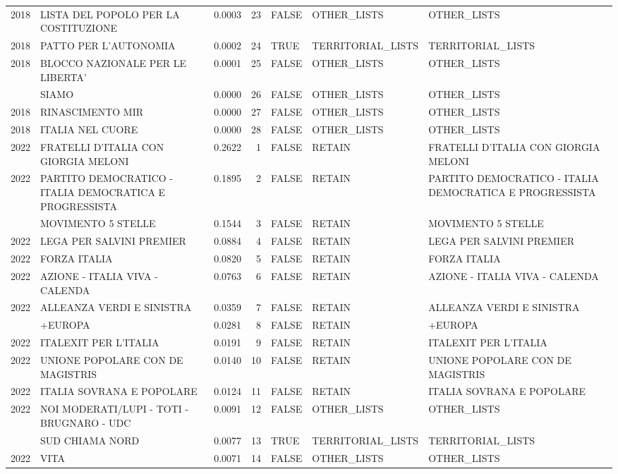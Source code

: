 \begin{longtable}[t]{rlrrlll}
2018 & LISTA DEL POPOLO PER LA COSTITUZIONE & 0.0003 & 23 & FALSE & OTHER\_LISTS & OTHER\_LISTS\\
2018 & PATTO PER L'AUTONOMIA & 0.0002 & 24 & TRUE & TERRITORIAL\_LISTS & TERRITORIAL\_LISTS\\
2018 & BLOCCO NAZIONALE PER LE LIBERTA' & 0.0001 & 25 & FALSE & OTHER\_LISTS & OTHER\_LISTS\\
\addlinespace
2018 & SIAMO & 0.0000 & 26 & FALSE & OTHER\_LISTS & OTHER\_LISTS\\
2018 & RINASCIMENTO MIR & 0.0000 & 27 & FALSE & OTHER\_LISTS & OTHER\_LISTS\\
2018 & ITALIA NEL CUORE & 0.0000 & 28 & FALSE & OTHER\_LISTS & OTHER\_LISTS\\
2022 & FRATELLI D'ITALIA CON GIORGIA MELONI & 0.2622 & 1 & FALSE & RETAIN & FRATELLI D'ITALIA CON GIORGIA MELONI\\
2022 & PARTITO DEMOCRATICO - ITALIA DEMOCRATICA E PROGRESSISTA & 0.1895 & 2 & FALSE & RETAIN & PARTITO DEMOCRATICO - ITALIA DEMOCRATICA E PROGRESSISTA\\
\addlinespace
2022 & MOVIMENTO 5 STELLE & 0.1544 & 3 & FALSE & RETAIN & MOVIMENTO 5 STELLE\\
2022 & LEGA PER SALVINI PREMIER & 0.0884 & 4 & FALSE & RETAIN & LEGA PER SALVINI PREMIER\\
2022 & FORZA ITALIA & 0.0820 & 5 & FALSE & RETAIN & FORZA ITALIA\\
2022 & AZIONE - ITALIA VIVA - CALENDA & 0.0763 & 6 & FALSE & RETAIN & AZIONE - ITALIA VIVA - CALENDA\\
2022 & ALLEANZA VERDI E SINISTRA & 0.0359 & 7 & FALSE & RETAIN & ALLEANZA VERDI E SINISTRA\\
\addlinespace
2022 & +EUROPA & 0.0281 & 8 & FALSE & RETAIN & +EUROPA\\
2022 & ITALEXIT PER L'ITALIA & 0.0191 & 9 & FALSE & RETAIN & ITALEXIT PER L'ITALIA\\
2022 & UNIONE POPOLARE CON DE MAGISTRIS & 0.0140 & 10 & FALSE & RETAIN & UNIONE POPOLARE CON DE MAGISTRIS\\
2022 & ITALIA SOVRANA E POPOLARE & 0.0124 & 11 & FALSE & RETAIN & ITALIA SOVRANA E POPOLARE\\
2022 & NOI MODERATI/LUPI - TOTI - BRUGNARO - UDC & 0.0091 & 12 & FALSE & OTHER\_LISTS & OTHER\_LISTS\\
\addlinespace
2022 & SUD CHIAMA NORD & 0.0077 & 13 & TRUE & TERRITORIAL\_LISTS & TERRITORIAL\_LISTS\\
2022 & VITA & 0.0071 & 14 & FALSE & OTHER\_LISTS & OTHER\_LISTS\\

\end{longtable}
